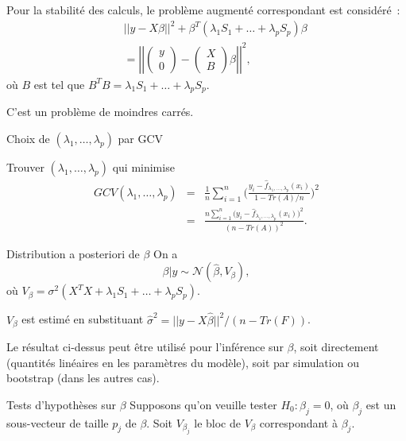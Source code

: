 \documentclass{BeamerTemplate}
\begin{document}
\begin{refsection}
\begin{frame}{}
Pour la stabilité des calculs, le problème augmenté correspondant est considéré~:
\begin{eqnarray*}
& & \left|\left| y - X \beta \right|\right|^2 + \beta^T (\lambda_1 S_1 +
\ldots + \lambda_p S_p) \beta \\
& & = \left|\left|
\left(\begin{array}{c}
y \\
0
\end{array} \right) -
\left(\begin{array}{c}
X \\
B
\end{array} \right) \beta
\right|\right|^2,
\end{eqnarray*}
où $B$ est tel que $B^T B = \lambda_1 S_1 + \ldots + \lambda_p S_p.$

\bigskip
C'est un problème de moindres carrés.
\end{frame}

\begin{frame}{Choix de $(\lambda_1, \ldots, \lambda_p)$ par GCV}

Trouver $(\lambda_1, \ldots, \lambda_p)$ qui minimise
\begin{eqnarray}
GCV(\lambda_1, \ldots, \lambda_p) & = &   \frac{1}{n} \sum_{i=1}^n \Big(\frac{y_i -
  \hat{f}_{\lambda_1, \ldots, \lambda_p}(x_i)}{1-Tr(A)/n} \Big)^2 \\
  & = &  \frac{n \sum_{i=1}^n \Big(y_i -
  \hat{f}_{\lambda_1, \ldots, \lambda_p}(x_i)\Big)^2}{(n-Tr(A))^2}.
\end{eqnarray}

\end{frame}



\begin{frame}{Distribution a posteriori de $\beta$}
On a
$$ \beta | y \sim {\mathcal N}(\hat{\beta}, V_{\beta}),$$
où $V_{\beta} = \sigma^2 (X^T X + \lambda_1 S_1 + \ldots + \lambda_p S_p)$.

\bigskip 
$V_{\beta}$ est estimé en substituant $\hat{\sigma}^2 = ||y - X
\hat{\beta}||^2/ (n - Tr(F))$. 

\bigskip
Le résultat ci-dessus peut être utilisé pour l'inférence sur $\beta$, soit directement (quantités linéaires en les paramètres du modèle), soit par simulation ou bootstrap (dans les autres cas).
\end{frame}

\begin{frame}{Tests d'hypothèses sur $\beta$}
Supposons qu'on veuille tester $H_0: \beta_j=0$, où $\beta_j$ est un sous-vecteur de taille
$p_j$ de 
$\beta$. Soit $V_{\beta_j}$ le bloc de $V_{\beta}$ correspondant à
$\beta_j$. 


\end{frame}
\end{refsection}
\end{document}
